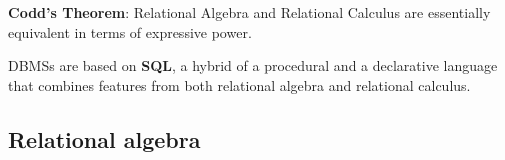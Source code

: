 \textbf{Codd's Theorem}: Relational Algebra and Relational Calculus are essentially equivalent in terms of expressive power.

DBMSs are based on \textbf{SQL}, a hybrid of a procedural and a declarative language that combines features from both relational algebra and relational calculus.

\subsection{Relational algebra}

